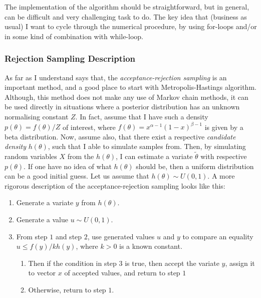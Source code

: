 \documentclass[a4paper,11pt,english]{article}
\begin{document}
			\noindent The implementation of the algorithm should be straightforward, but in general, can be difficult and very challenging task to do. The 
			key idea that (business as usual) I want to cycle through the numerical procedure, by using for-loops and/or in some kind of combination with 
			while-loop.	
			
			\subsubsection{Rejection Sampling Description}
	
			As far as I understand \citep[p.~267]{lee} says that, the \textit{acceptance-rejection sampling} is an important method, and a good place to 	
			start with Metropolis-Hastings algorithm. Although, this method does not make any use of Markov chain methods, it can be used directly in 					situations where a posterior distribution has an unknown normalising constant $Z$. In fact, assume that I have such a density
			$p(\theta)=f(\theta)/Z$ of interest, where $f(\theta)=x^{\alpha-1}(1-x)^{\beta-1}$ is given by a beta distribution. Now, assume also, that 
			there exist a respective \textit{candidate density} $h(\theta)$, such that I able to simulate samples from. Then, by simulating random 					variables $X$ from the $h(\theta)$, I can estimate a variate $\tilde{\theta}$ with respective $p(\theta)$. If one have no idea of what 					$h(\theta)$ should be, then a uniform distribution can be a good initial guess. Let us assume that $h(\theta) \sim U(0,1)$.  A more rigorous 				description of the acceptance-rejection sampling looks like this:
		
			\begin{enumerate}
				\item Generate a variate $y$ from $h(\theta)$.
				\item Generate a value $u \sim U(0,1)$.
				\item From step $1$ and step $2$, use generated values $u$ and $y$ to compare an equality $u\leq f(y)/kh(y)$, where $k>0$ is a known
				constant.
				\begin{enumerate}
					\item Then if the condition in step $3$ is true, then accept the variate $y$, assign it to vector $x$ of accepted values, and return 
					to step $1$ 
					\item Otherwise, return to step $1$.				
				\end{enumerate}	   		
			\end{enumerate}	   
	
\end{document}
